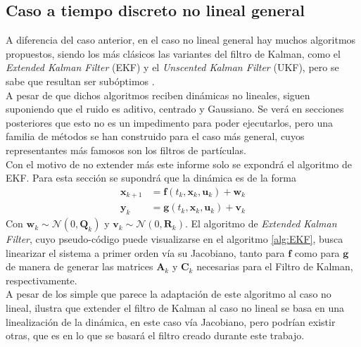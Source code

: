 \subsection{Caso a tiempo discreto no lineal general}
A diferencia del caso anterior, en el caso no lineal general hay muchos algoritmos propuestos, siendo los más clásicos las variantes del filtro de Kalman, como el \textit{Extended Kalman Filter} (EKF) y el \textit{Unscented Kalman Filter} (UKF), pero se sabe que resultan ser subóptimos \cite{Setoodeh2022NonlinearApplications}.\\ 
A pesar de que dichos algoritmos reciben dinámicas no lineales, siguen suponiendo que el ruido es aditivo, centrado y Gaussiano. Se verá en secciones posteriores que esto no es un impedimento para poder ejecutarlos, pero una familia de métodos se han construido para el caso más general, cuyos representantes más famosos son los filtros de partículas.\\
Con el motivo de no extender más este informe solo se expondrá el algoritmo de EKF. Para esta sección se supondrá que la dinámica es de la forma
\begin{equation}
	\begin{aligned}
		\mathbf{x}_{k+1} &= \mathbf{f}(t_k, \mathbf{x}_k, \mathbf{u}_k) + \mathbf{w}_k \\
		\mathbf{y}_k &= \mathbf{g}(t_k, \mathbf{x}_k, \mathbf{u}_k) + \mathbf{v}_k 
	\end{aligned}
	\label{eq:no_lin_disc_add}
\end{equation}
Con $\mathbf{w}_k \sim \mathcal{N}(0, \mathbf{Q}_k)$ y $\mathbf{v}_k \sim \mathcal{N}(0, \mathbf{R}_k)$. 
El algoritmo de \textit{Extended Kalman Filter}, cuyo pseudo-código puede visualizarse en el algoritmo \ref{alg:EKF}, busca linearizar el sistema a primer orden vía su Jacobiano, tanto para $\mathbf{f}$ como para $\mathbf{g}$ de manera de generar las matrices $\mathbf{A}_k$ y $\mathbf{C}_k$ necesarias para el Filtro de Kalman, respectivamente. \\
A pesar de los simple que parece la adaptación de este algoritmo al caso no lineal, ilustra que extender el filtro de Kalman al caso no lineal se basa en una linealización de la dinámica, en este caso vía Jacobiano, pero podrían existir otras, que es en lo que se basará el filtro creado durante este trabajo.

